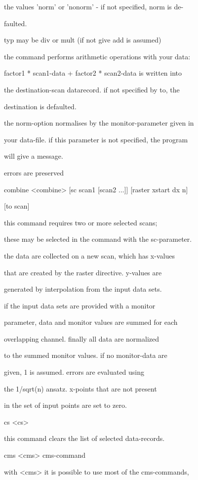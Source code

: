 \documentclass[]{article}
\begin{document}
the values 'norm' or 'nonorm' - if not specified, norm is de-

faulted.

typ may be div or mult (if not give add is assumed)

the command performs arithmetic operations with your data:

factor1 * scan1-data + factor2 * scan2-data is written into

the destination-scan datarecord. if not specified by to, the

destination is defaulted.

the norm-option normalises by the monitor-parameter given in

your data-file. if this parameter is not specified, the program

will give a message.

errors are preserved

combine \textless{}combine\textgreater{} {[}sc scan1 {[}scan2 ...{]}{]}
{[}raster xstart dx n{]}

{[}to scan{]}

this command requires two or more selected scans;

these may be selected in the command with the sc-parameter.

the data are collected on a new scan, which has x-values

that are created by the raster directive. y-values are

generated by interpolation from the input data sets.

if the input data sets are provided with a monitor

parameter, data and monitor values are summed for each

overlapping channel. finally all data are normalized

to the summed monitor values. if no monitor-data are

given, 1 is assumed. errors are evaluated using

the 1/sqrt(n) ansatz. x-points that are not present

in the set of input points are set to zero.

cs \textless{}cs\textgreater{}

this command clears the list of selected data-records.

cms \textless{}cms\textgreater{} cms-command

with \textless{}cms\textgreater{} it is possible to use most of the
cms-commands,
\end{document}
